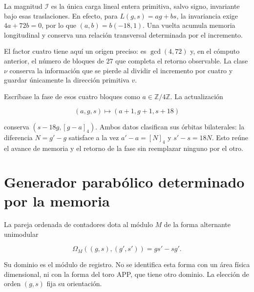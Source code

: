 La magnitud \(\mathcal I\) es la única carga lineal entera primitiva, salvo signo, invariante bajo esas traslaciones. En efecto, para \(L(g,s)=ag+bs\), la invariancia exige \(4a+72b=0\), por lo que \((a,b)=b(-18,1)\). Una vuelta acumula memoria longitudinal y conserva una relación transversal determinada por el incremento.

El factor cuatro tiene aquí un origen preciso: es \(\gcd(4,72)\) y, en el cómputo anterior, el número de bloques de 27 que completa el retorno observable. La clase \(\nu\) conserva la información que se pierde al dividir el incremento por cuatro y guardar únicamente la dirección primitiva \(v\).

\begin{corollary}

Escríbase la fase de esos cuatro bloques como \(a\in\mathbb Z/4\mathbb Z\). La actualización

\[
(a,g,s)\longmapsto(a+1,g+1,s+18)
\]

conserva \((s-18g,[g-a]_4)\). Ambos datos clasifican sus órbitas bilaterales: la diferencia \(N=g'-g\) satisface a la vez \(a'-a=[N]_4\) y \(s'-s=18N\). Esto reúne el avance de memoria y el retorno de la fase sin reemplazar ninguno por el otro.
\end{corollary}

\section{Generador parabólico determinado por la memoria}

La pareja ordenada de contadores dota al módulo \(M\) de la forma alternante unimodular

\[
\Omega_M((g,s),(g',s'))=gs'-sg'.
\]

Su dominio es el módulo de registro. No se identifica esta forma con un área física dimensional, ni con la forma del toro APP, que tiene otro dominio. La elección de orden \((g,s)\) fija su orientación.

